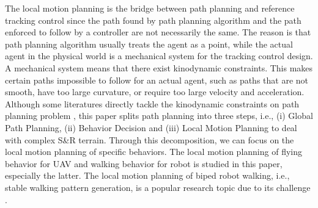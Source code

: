 \documentclass[journal,12pt,onecolumn,draftclsnofoot,]{IEEEtran}
\begin{document}

The local motion planning is the bridge between path planning and reference tracking control since the path found by path planning algorithm and the path enforced to follow by a controller are not necessarily the same. The reason is that path planning algorithm usually treats the agent as a point, while the actual agent in the physical world is a mechanical system for the tracking control design. A mechanical system means that there exist kinodynamic constraints. This makes certain paths impossible to follow for an actual agent, such as paths that are not smooth, have too large curvature, or require too large velocity and acceleration. Although some literatures directly tackle the kinodynamic constraints on path planning problem \cite{9384209}, this paper splits path planning into three steps, i.e., (i) Global Path Planning, (ii) Behavior Decision and (iii) Local Motion Planning to deal with complex S\&R terrain. Through this decomposition, we can focus on the local motion planning of specific behaviors. The local motion planning of flying behavior for UAV and walking behavior for robot is studied in this paper, especially the latter. The local motion planning of biped robot walking, i.e., stable walking pattern generation, is a popular research topic due to its challenge \cite{olcay2017design}.
\end{document}
